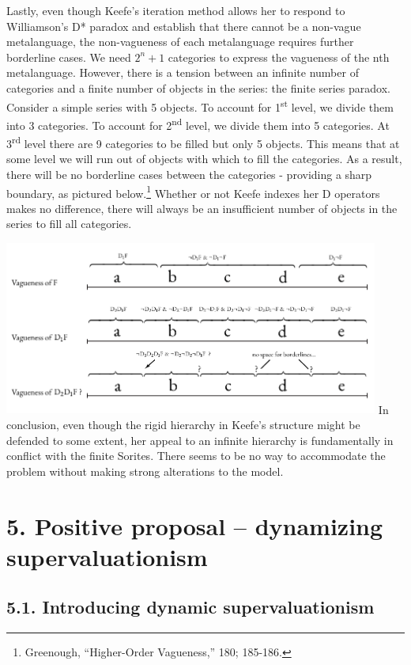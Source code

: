 Lastly, even though Keefe's iteration method allows her to respond to
Williamson's D* paradox and establish that there cannot be a non-vague
metalanguage, the non-vagueness of each metalanguage requires further
borderline cases. We need \(2^{n} + 1\) categories to express the
vagueness of the nth metalanguage. However, there is a tension between
an infinite number of categories and a finite number of objects in the
series: the finite series paradox. Consider a simple series with 5
objects. To account for 1\textsuperscript{st} level, we divide them into
3 categories. To account for 2\textsuperscript{nd} level, we divide them
into 5 categories. At 3\textsuperscript{rd} level there are 9 categories
to be filled but only 5 objects. This means that at some level we will
run out of objects with which to fill the categories. As a result, there
will be no borderline cases between the categories - providing a sharp
boundary, as pictured below.\footnote{Greenough, ``Higher-Order
  Vagueness,'' 180; 185-186.} Whether or not Keefe indexes her D
operators makes no difference, there will always be an insufficient
number of objects in the series to fill all categories.

\includegraphics[width=0.925\textwidth]{papers/figures/2-2.pdf}
In conclusion, even though the rigid hierarchy in Keefe's structure
might be defended to some extent, her appeal to an infinite hierarchy is
fundamentally in conflict with the finite Sorites. There seems to be no
way to accommodate the problem without making strong alterations to the
model.

\section{5. Positive proposal -- dynamizing supervaluationism}

\subsection{5.1. Introducing dynamic supervaluationism}

